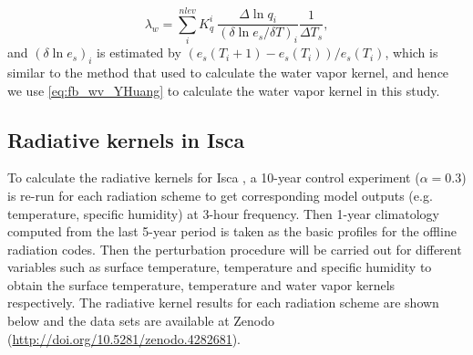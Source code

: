 \begin{equation}
\lambda_w = \sum_i^{nlev} K^i_q ~\frac{\Delta \ln q_i}{(\delta \ln e_s/ \delta T)_i} \frac{1}{\Delta T_s},
\label{eq:fb_wv_YHuang}
\end{equation}
and $(\delta \ln e_s)_i$ is estimated by $\left(e_s(T_i+1)-e_s(T_i)\right)/ e_s(T_i)$, which is similar to the method that \cite{Pendergrass2018} used to calculate the water vapor kernel, and hence we use \eqref{eq:fb_wv_YHuang} to calculate the water vapor kernel in this study.

\subsection{Radiative kernels in Isca}
 
 To calculate the radiative kernels for Isca , a 10-year control experiment ($\alpha= 0.3$) is re-run for each radiation scheme to get corresponding model outputs (e.g. temperature, specific humidity) at 3-hour frequency. Then 1-year climatology computed from the last 5-year period is taken as the basic profiles for the offline radiation codes. Then the perturbation procedure will be carried out for different variables such as surface temperature, temperature and specific humidity to obtain the surface temperature, temperature and water vapor kernels respectively. The radiative kernel results for each radiation scheme are shown below and the data sets are available at Zenodo (\url{http://doi.org/10.5281/zenodo.4282681}).

